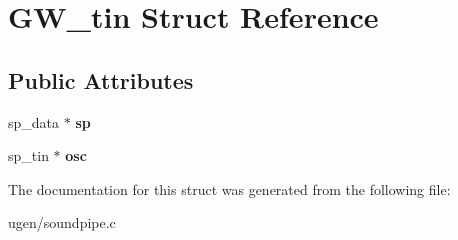 \hypertarget{structGW__tin}{}\section{G\+W\+\_\+tin Struct Reference}
\label{structGW__tin}
\subsection*{Public Attributes}
\begin{DoxyCompactItemize}
\item 
\hypertarget{structGW__tin_a82b3c77d053c40bd144d9b272a21f960}{}\label{structGW__tin_a82b3c77d053c40bd144d9b272a21f960} 
sp\+\_\+data $\ast$ {\bfseries sp}
\item 
\hypertarget{structGW__tin_ac58342416e9c481f3198e98bb7789c62}{}\label{structGW__tin_ac58342416e9c481f3198e98bb7789c62} 
sp\+\_\+tin $\ast$ {\bfseries osc}
\end{DoxyCompactItemize}


The documentation for this struct was generated from the following file\+:\begin{DoxyCompactItemize}
\item 
ugen/soundpipe.\+c\end{DoxyCompactItemize}
